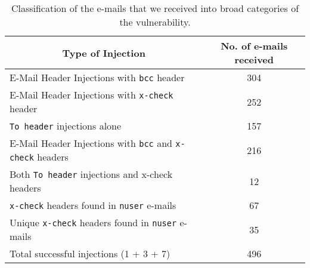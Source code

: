\begin{table*}[!htbp]
	\centering
	\begin{tabular}{|l|c|}
		\hline
		\multicolumn{1}{|c|}{\textbf{Type of Injection}} &
		\multicolumn{1}{p{3cm}|}{\centering \textbf{No. of e-mails received}}\\
		\hline
		E-Mail Header Injections with \texttt{bcc} header & 304\\
		\hline
		E-Mail Header Injections with \texttt{x-check} header & 252\\
		\hline
		\texttt{To header} injections alone & 157\\
		\hline
		E-Mail Header Injections with \texttt{bcc} and \texttt{x-check} headers & 216\\
		\hline
		Both \texttt{To header} injections and x-check headers &
		12\\
		\hline
		\texttt{x-check} headers found in \texttt{nuser} e-mails & 67\\
		\hline
		Unique \texttt{x-check} headers found in \texttt{nuser} e-mails & 35\\
		\hline
		Total successful injections (1 + 3 + 7) & 496\\
		
		\hline
	\end{tabular}
	\caption[]{Classification of the e-mails that we received into broad categories of the vulnerability.}
	\label{tab:analysis}
\end{table*}